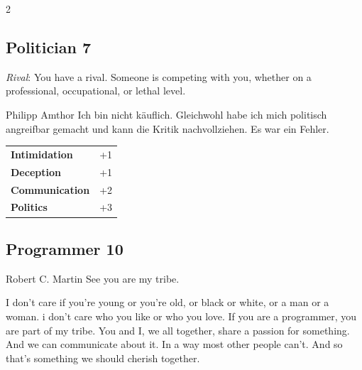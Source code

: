 \begin{multicols}{2}
\begin{tcolorbox}

\end{tcolorbox}

\begin{tcolorbox}
    \subsection*{Politician \hfill \small{7 }}
    \tcblower
\textit{Rival}: You have a rival. Someone is competing with you, whether on a professional, occupational, or lethal level.

\begin{pquote}{Philipp Amthor}
Ich bin nicht käuflich. Gleichwohl habe ich mich politisch angreifbar gemacht und kann die Kritik nachvollziehen. Es war ein Fehler.
\end{pquote}

\vspace{3mm}

\begin{tabular}{@{}ll@{}}
    \textbf{Intimidation} & +1\\
    \textbf{Deception} & +1\\
    \textbf{Communication} & +2\\
    \textbf{Politics} & +3\\
\end{tabular}


\end{tcolorbox}

\begin{tcolorbox}
    \subsection*{Programmer \hfill \small{10 }}
    \tcblower


\begin{pquote}{Robert C. Martin}
See you are my tribe.

I don't care if you're young or you're old, or black or white, or a man or a woman. i don't care who you like or who you love. If you are a programmer, you are part of my tribe. You and I, we all together, share a passion for something. And we can communicate about it. In a way most other people can't. And so that's something we should cherish together.
\end{pquote}


\end{tcolorbox}
\end{multicols}
